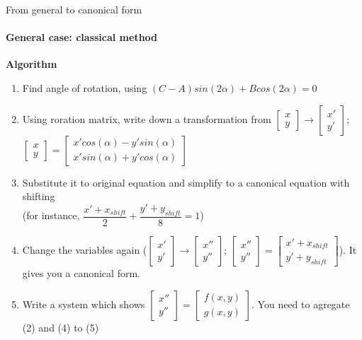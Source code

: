 \documentclass[aspectratio=169]{beamer}
\begin{document}
\begin{frame}[t]{From general to canonical form}
\framesubtitle{General case: classical method}
\scriptsize
\vspace{-0.2cm}
        \textbf{Algorithm}
        \begin{enumerate}
            \item Find angle of rotation, using $(C-A)sin(2\alpha) + Bcos(2\alpha)=0$
            \item Using roration matrix, write down a transformation from $\begin{bmatrix}x\\y\end{bmatrix} \rightarrow \begin{bmatrix}x'\\y'\end{bmatrix}$; $\begin{bmatrix}x\\y\end{bmatrix} = \begin{bmatrix}
            x'cos(\alpha) - y'sin(\alpha)\\ 
            x'sin(\alpha) + y'cos(\alpha) 
            \end{bmatrix}$
            \item Substitute it to original equation and simplify to a canonical equation with shifting \\ (for instance, $\dfrac{x'+x_{shift}}{2}+\dfrac{y'+y_{shift}}{8}=1$)
            \item Change the variables again ($\begin{bmatrix}x'\\y'\end{bmatrix} \rightarrow \begin{bmatrix}x''\\y''\end{bmatrix}$; $\begin{bmatrix}x''\\y''\end{bmatrix} = \begin{bmatrix}x' + x_{shift}\\y'+y_{shift}\end{bmatrix}$). It gives you a canonical form.
            \item Write a system which shows $\begin{bmatrix}x''\\y''\end{bmatrix} = \begin{bmatrix}f(x,y)\\g(x,y)\end{bmatrix}$. You need to agregate (2) and (4) to (5)
        \end{enumerate}
\end{frame}
\end{document}
